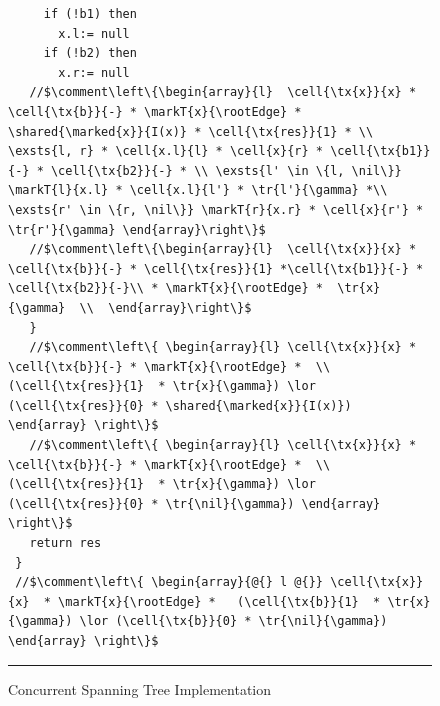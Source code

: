 \begin{figure}
\begin{lstlisting}
     if (!b1) then 
       x.l:= null
     if (!b2) then 
       x.r:= null
   //$\comment\left\{\begin{array}{l}  \cell{\tx{x}}{x} * \cell{\tx{b}}{-} * \markT{x}{\rootEdge} * \shared{\marked{x}}{I(x)} * \cell{\tx{res}}{1} * \\ \exsts{l, r} * \cell{x.l}{l} * \cell{x}{r} * \cell{\tx{b1}}{-} * \cell{\tx{b2}}{-} * \\ \exsts{l' \in \{l, \nil\}} \markT{l}{x.l} * \cell{x.l}{l'} * \tr{l'}{\gamma} *\\ \exsts{r' \in \{r, \nil\}} \markT{r}{x.r} * \cell{x}{r'} * \tr{r'}{\gamma} \end{array}\right\}$  
   //$\comment\left\{\begin{array}{l}  \cell{\tx{x}}{x} * \cell{\tx{b}}{-} * \cell{\tx{res}}{1} *\cell{\tx{b1}}{-} * \cell{\tx{b2}}{-}\\ * \markT{x}{\rootEdge} *  \tr{x}{\gamma}  \\  \end{array}\right\}$         
   }		
   //$\comment\left\{ \begin{array}{l} \cell{\tx{x}}{x} * \cell{\tx{b}}{-} * \markT{x}{\rootEdge} *  \\  (\cell{\tx{res}}{1}  * \tr{x}{\gamma}) \lor (\cell{\tx{res}}{0} * \shared{\marked{x}}{I(x)}) \end{array} \right\}$ 
   //$\comment\left\{ \begin{array}{l} \cell{\tx{x}}{x} * \cell{\tx{b}}{-} * \markT{x}{\rootEdge} *  \\  (\cell{\tx{res}}{1}  * \tr{x}{\gamma}) \lor (\cell{\tx{res}}{0} * \tr{\nil}{\gamma}) \end{array} \right\}$      
   return res
 }
 //$\comment\left\{ \begin{array}{@{} l @{}} \cell{\tx{x}}{x}  * \markT{x}{\rootEdge} *   (\cell{\tx{b}}{1}  * \tr{x}{\gamma}) \lor (\cell{\tx{b}}{0} * \tr{\nil}{\gamma}) \end{array} \right\}$         
\end{lstlisting}
\hrule\vspace*{5pt}
\caption{Concurrent Spanning Tree Implementation}
\label{fig:conSpanningTree}
\end{figure}
%


